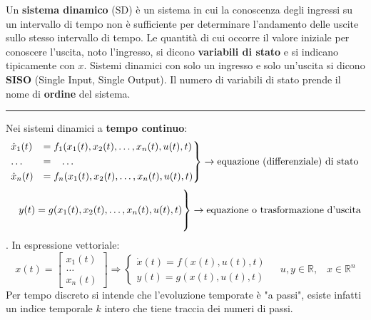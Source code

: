 Un \textbf{sistema dinamico} (SD) è un sistema in cui la conoscenza degli ingressi su un intervallo di tempo non è sufficiente per determinare l'andamento delle uscite sullo stesso intervallo di tempo.\newline
\newline
Le quantità di cui occorre il valore iniziale per conoscere l'uscita, noto l'ingresso, si dicono \textbf{variabili di stato} e si indicano tipicamente con $x$.\newline
\newline
Sistemi dinamici con solo un ingresso e solo un'uscita si dicono \textbf{SISO} (Single Input, Single Output).\newline
\newline
Il numero di variabili di stato prende il nome di \textbf{ordine} del sistema.\newline
\rule{\textwidth}{0,4pt}\newline
\newline
Nei sistemi dinamici a \textbf{tempo continuo}:
\[
    \begin{rcases}
        \dot{x}_1(t) &= f_1(x_1(t),x_2(t), \dots, x_n(t), u(t), t)\\
        \dots \;\;\;&= \;\;\;\dots\\
        \dot{x}_n(t) &= f_n(x_1(t),x_2(t), \dots, x_n(t), u(t), t)
    \end{rcases} \rightarrow \text{equazione (differenziale) di stato}\;
\]
\[
    \begin{rcases}
        \\
        \;\;\;\; y(t) = g(x_1(t),x_2(t), \dots, x_n(t), u(t), t)\\
        \\
    \end{rcases} \rightarrow \text{equazione o trasformazione d'uscita}\;
\].\newline
In espressione vettoriale:
\[
    x(t) = \left[\begin{matrix}
        x_1(t)\\
        \dots\\
        x_n(t)
    \end{matrix}\right] \Rightarrow  \begin{cases}
        \dot{x}(t) = f(x(t), u(t),t)\\
        y(t) = g(x(t),u(t),t)
    \end{cases} \;\;\;\;u,y \in \mathbb{R}, \;\;\;x \in \mathbb{R}^n
\]
Per tempo discreto si intende che l'evoluzione temporate è "a passi", esiste infatti un indice temporale $k$ intero che tiene traccia dei numeri di passi.\newline
